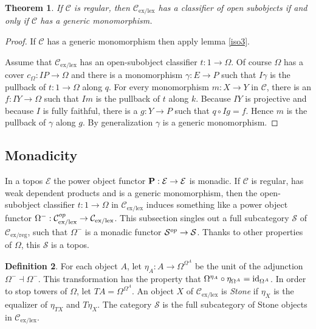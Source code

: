 \documentclass[sort&compress]{elsarticle}
\theoremstyle{plain}
\newtheorem{theorem}{Theorem}
\theoremstyle{definition}
\newtheorem{defin}[theorem]{Definition}
\theoremstyle{remark}
\newcommand\hide[1]{}
\newcommand\cat\mathcal
\newcommand\exlex{_\mathrm{ex/lex}}\newcommand\exreg{_\mathrm{ex/reg}}
\begin{document}
\begin{theorem} If $\cat C$ is regular, then $\cat C\exlex$ has a classifier of open subobjects if and only if $\cat C$ has a generic monomorphism. \label{closubclass}\end{theorem}

\begin{proof} If $\cat C$ has a generic monomorphism then apply lemma \ref{iso3}.

Assume that $\cat C\exlex$ has an open-subobject classifier $t:1\to \Omega$. Of course $\Omega$ has a cover $c_\Omega:IP\to \Omega$ and there is a monomorphism $\gamma:E\to P$ such that $I\gamma$ is the pullback of $t:1\to \Omega$ along $q$. For every monomorphism $m:X\to Y$ in $\cat C$, there is an $f:IY \to \Omega$ such that $Im$ is the pullback of $t$ along $k$. Because $IY$ is projective and because $I$ is fully faithful, there is a $g:Y \to P$ such that $q\circ Ig = f$. Hence $m$ is the pullback of $\gamma$ along $g$. By generalization $\gamma$ is a generic monomorphism.
\end{proof}

\subsection{Monadicity}
In a topos $\cat E$ the power object functor $\pow:\cat E\to \cat E$ is monadic. If $\cat C$ is regular, has weak dependent products and is a generic monomorphism, then the open-subobject classifier $t:1\to\Omega$ in $\cat C\exlex$ induces something like a power object functor $\Omega^-: \cat C\exlex\dual \to \cat C\exlex$. This subsection singles out a full subcategory $\cat S$ of $\cat C\exreg$, such that $\Omega^-$ is a monadic functor $\cat S\dual \to\cat S$. Thanks to other properties of $\Omega$, this $\cat S$ is a topos.

\hide{Een voorbeeld van een reguliere cat met zwakke afhankelijke producten en een generiek monomorfisme die geen sterke producten heeft. Dit lijkt me lastiger.

Moeten we daar hier nog even naar verwijzen?
}

\newcommand\clopow{\Omega^}
\newcommand\unit{\eta_}
\begin{defin} For each object $A$, let $\unit A:A\to \clopow{\clopow A}$ be the unit of the adjunction $\clopow- \dashv \clopow-$. This transformation has the property that $\clopow{\unit A}\circ \unit{\clopow A} = \id_{\clopow A}$. In order to stop towers of $\Omega$, let $TA = \clopow{\clopow A}$.
An object $X$ of $\cat C\exlex$ is \emph{Stone} if $\unit X$ is the equalizer of $\unit{TX}$ and $T\unit X$. The category $\cat S$ is the full subcategory of Stone objects in $\cat C\exlex$.
\end{defin}
\end{document}
